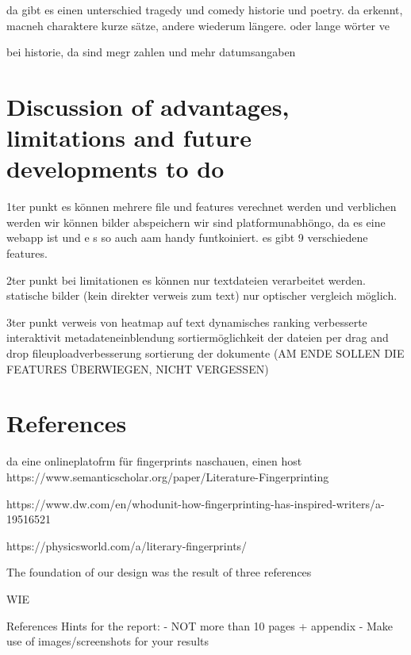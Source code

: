 \documentclass[runningheads]{llncs}
\begin{document}
da gibt es einen unterschied tragedy und comedy
historie und poetry.
da erkennt, macneh charaktere kurze sätze, andere wiederum längere.
oder lange wörter ve

bei historie, da sind megr zahlen und mehr datumsangaben



\section{Discussion of advantages, limitations and future developments to do}

1ter punkt
es können mehrere file und features verechnet werden und verblichen werden  wir können bilder abspeichern wir sind platformunabhöngo, da es eine webapp ist und e s so auch aam handy funtkoiniert.
es gibt 9 verschiedene features.

2ter punkt
bei limitationen
es können nur textdateien verarbeitet werden.
statische bilder (kein direkter verweis zum text)
nur optischer vergleich möglich.

3ter punkt
verweis von heatmap auf text
dynamisches ranking
verbesserte interaktivit
metadateneinblendung
sortiermöglichkeit der dateien per drag and drop
fileuploadverbesserung
sortierung der dokumente
(AM ENDE SOLLEN DIE FEATURES ÜBERWIEGEN, NICHT VERGESSEN)


\section{References}

da eine onlineplatofrm für fingerprints naschauen, einen host
https://www.semanticscholar.org/paper/Literature-Fingerprinting%

https://www.dw.com/en/whodunit-how-fingerprinting-has-inspired-writers/a-19516521


https://physicsworld.com/a/literary-fingerprints/

The foundation of our design was the result of three references

WIE

References Hints for the report:
- NOT more than 10 pages + appendix
- Make use of images/screenshots for your results
\end{document}

